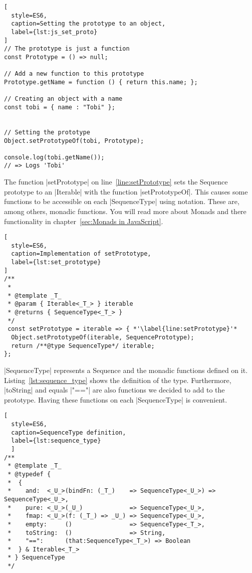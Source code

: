 \begin{lstlisting}[
  style=ES6,
  caption=Setting the prototype to an object,
  label={lst:js_set_proto}
]
// The prototype is just a function
const Prototype = () => null; 

// Add a new function to this prototype
Prototype.getName = function () { return this.name; };

// Creating an object with a name
const tobi = { name : "Tobi" };


// Setting the prototype
Object.setPrototypeOf(tobi, Prototype);

console.log(tobi.getName());
// => Logs 'Tobi' 
\end{lstlisting}


The function |setPrototype| on line~\ref{line:setPrototype} sets the Sequence 
prototype to an |Iterable| with the function |setPrototypeOf|. This causes some functions to be accessible on each 
|SequenceType| using notation. These are, among others, monadic functions. You will read more
about Monads and there functionality in chapter~\ref{sec:Monads in JavaScript}.
\begin{lstlisting}[
  style=ES6,
  caption=Implementation of setPrototype,
  label={lst:set_prototype}
]
/**
 *
 * @template _T_
 * @param { Iterable<_T_> } iterable
 * @returns { SequenceType<_T_> }
 */
 const setPrototype = iterable => { *'\label{line:setPrototype}'*
  Object.setPrototypeOf(iterable, SequencePrototype);
  return /**@type SequenceType*/ iterable;
};
\end{lstlisting}

|SequenceType| represents a Sequence and the monadic functions defined on it. 
Listing~\ref{lst:sequence_type} shows the definition of the type.
Furthermore, |toString| and equals |"=="| are also functions we decided to add to the
prototype. Having these functions on each |SequenceType| is convenient.

\begin{lstlisting}[
  style=ES6, 
  caption=SequenceType definition,
  label={lst:sequence_type}
  ]
/**
 * @template _T_
 * @typedef {
 *  {
 *    and:  <_U_>(bindFn: (_T_)    => SequenceType<_U_>) => SequenceType<_U_>,
 *    pure: <_U_>(_U_)             => SequenceType<_U_>,
 *    fmap: <_U_>(f: (_T_) => _U_) => SequenceType<_U_>,
 *    empty:     ()                => SequenceType<_T_>,
 *    toString:  ()                => String,
 *    "==":      (that:SequenceType<_T_>) => Boolean
 *  } & Iterable<_T_>
 * } SequenceType
 */
\end{lstlisting}

